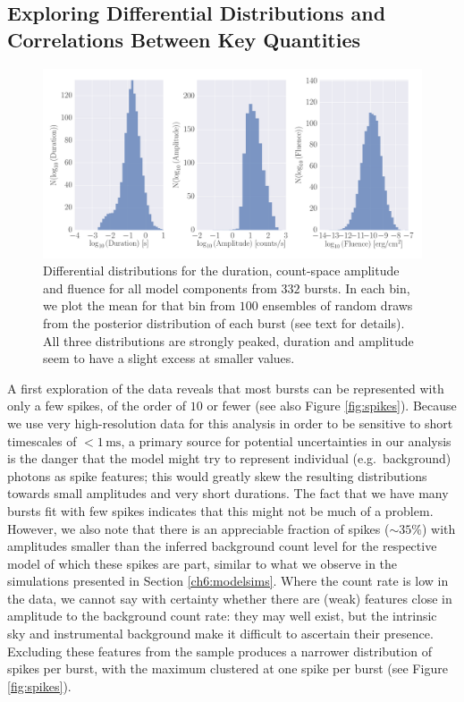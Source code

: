 \documentclass[12pt]{emulateapj}
\begin{document}
\subsection{Exploring Differential Distributions and Correlations Between Key Quantities}
\label{ch6:exploration}
  \begin{figure}[htbp]
\begin{center}
\includegraphics[width=\textwidth]{f5.pdf}%
\caption{Differential distributions for the duration, count-space amplitude and fluence for all model components from $332$ bursts. In each bin, we plot the mean for
that bin from $100$ ensembles of random draws from the posterior distribution of each burst (see text for details). All three distributions are 
strongly peaked, duration and amplitude seem to have a slight excess at smaller values.}
\label{fig:diffdist}
\end{center}
\end{figure}

A first exploration of the data reveals that most bursts can be represented with only a few spikes, of the order of 
$10$ or fewer (see also Figure \ref{fig:spikes}). Because we use very high-resolution data for this analysis in order to
be sensitive to short timescales of $< 1\,\mathrm{ms}$, a primary source for potential uncertainties in our analysis is the
danger that the model might try to represent individual (e.g.\ background) photons as spike features; this would greatly
skew the resulting distributions towards small amplitudes and very short durations. The fact that we have many bursts
fit with few spikes indicates that this might not be much of a problem. However, we also note that there is an appreciable fraction
of spikes ($\sim 35\%$) with amplitudes smaller than the inferred background count level for the respective model of which these spikes 
are part, similar to what we observe in the simulations presented in Section \ref{ch6:modelsims}. Where the count rate is low in the
data, we cannot say with certainty whether there are (weak) features close in amplitude to the background count rate: they may well exist, but the intrinsic sky and instrumental background
 make it difficult to ascertain their presence. Excluding these features from the sample produces a narrower distribution
of spikes per burst, with the maximum clustered at one spike per burst (see Figure \ref{fig:spikes}).
\end{document}
